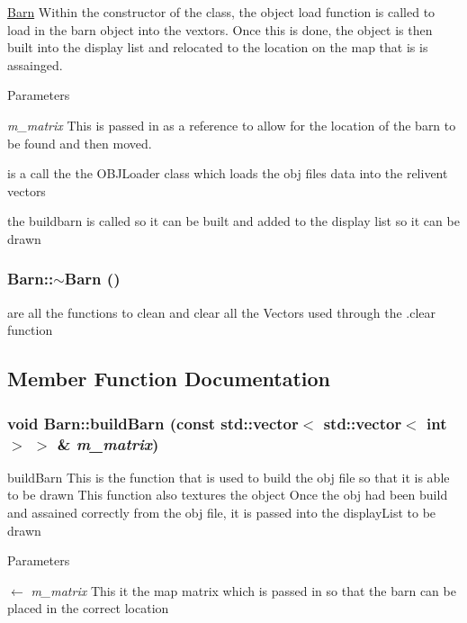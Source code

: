 \hyperlink{classBarn}{Barn} Within the constructor of the class, the object load function is called to load in the barn object into the vextors. Once this is done, the object is then built into the display list and relocated to the location on the map that is is assainged. 
\begin{DoxyParams}{Parameters}
\item[{\em m\_\-matrix}]This is passed in as a reference to allow for the location of the barn to be found and then moved. \end{DoxyParams}


is a call the the OBJLoader class which loads the obj files data into the relivent vectors

the buildbarn is called so it can be built and added to the display list so it can be drawn \hypertarget{classBarn_a24235aae94c8da869b27b02c07f2420e}{
\subsubsection[{$\sim$Barn}]{\setlength{\rightskip}{0pt plus 5cm}Barn::$\sim$Barn ()}}
\label{classBarn_a24235aae94c8da869b27b02c07f2420e}


are all the functions to clean and clear all the Vectors used through the .clear function 

\subsection{Member Function Documentation}
\hypertarget{classBarn_a93eaee9dc2054c8aaecd39e859f5dc29}{
\subsubsection[{buildBarn}]{\setlength{\rightskip}{0pt plus 5cm}void Barn::buildBarn (const std::vector$<$ std::vector$<$ int $>$ $>$ \& {\em m\_\-matrix})}}
\label{classBarn_a93eaee9dc2054c8aaecd39e859f5dc29}


buildBarn This is the function that is used to build the obj file so that it is able to be drawn This function also textures the object Once the obj had been build and assained correctly from the obj file, it is passed into the displayList to be drawn 
\begin{DoxyParams}{Parameters}
\item[\mbox{$\leftarrow$} {\em m\_\-matrix}]This it the map matrix which is passed in so that the barn can be placed in the correct location \end{DoxyParams}


